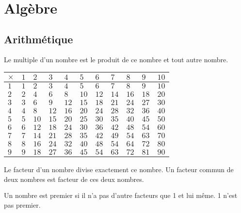 \chapter{Algèbre}
\section{Arithmétique}

\begin{Definition}[Multiple]
    Le multiple d'un nombre est le produit de ce nombre et tout autre nombre.    
\end{Definition}

\begin{tabular}{|l||l|l|l|l|l|l|l|l|l|l|}
    \hline
    $\times$ & $ 1$ & $ 2$ & $ 3$ & $ 4$ & $ 5$ & $ 6$ & $ 7$ & $ 8$ & $ 9$ & $10$ \\ \hline \hline
    $1$      & $ 1$ & $ 2$ & $ 3$ & $ 4$ & $ 5$ & $ 6$ & $ 7$ & $ 8$ & $ 9$ & $10$ \\ \hline
    $2$      & $ 2$ & $ 4$ & $ 6$ & $ 8$ & $10$ & $12$ & $14$ & $16$ & $18$ & $20$ \\ \hline
    $3$      & $ 3$ & $ 6$ & $ 9$ & $12$ & $15$ & $18$ & $21$ & $24$ & $27$ & $30$ \\ \hline
    $4$      & $ 4$ & $ 8$ & $12$ & $16$ & $20$ & $24$ & $28$ & $32$ & $36$ & $40$ \\ \hline
    $5$      & $ 5$ & $10$ & $15$ & $20$ & $25$ & $30$ & $35$ & $40$ & $45$ & $50$ \\ \hline
    $6$      & $ 6$ & $12$ & $18$ & $24$ & $30$ & $36$ & $42$ & $48$ & $54$ & $60$ \\ \hline
    $7$      & $ 7$ & $14$ & $21$ & $28$ & $35$ & $42$ & $49$ & $54$ & $63$ & $70$ \\ \hline
    $8$      & $ 8$ & $16$ & $24$ & $32$ & $40$ & $48$ & $54$ & $64$ & $72$ & $80$ \\ \hline 
    $9$      & $ 9$ & $18$ & $27$ & $36$ & $45$ & $54$ & $63$ & $72$ & $81$ & $90$ \\ \hline
\end{tabular}

\begin{Definition}[Facteur]
    Le facteur d'un nombre divise exactement ce nombre.
    Un facteur commun de deux nombres est facteur de ces deux nombres.
\end{Definition}

\begin{Definition}[Premier]
    Un nombre est premier si il n'a pas d'autre facteurs que 1 et lui même.
    1 n'est pas premier.
\end{Definition}

